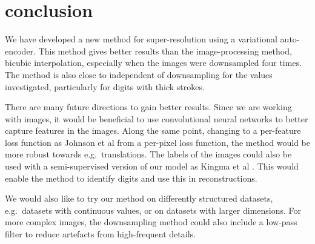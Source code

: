 \section{conclusion}
\label{sec:conclusion}

We have developed a new method for super-resolution using a variational auto-encoder.
This method gives better results than the image-processing method, bicubic interpolation, especially when the images were downsampled four times.
The method is also close to independent of downsampling for the values investigated, particularly for digits with thick strokes.

There are many future directions to gain better results.
Since we are working with images, it would be beneficial to use convolutional neural networks to better capture features in the images.
Along the same point, changing to a per-feature loss function as Johnson et al \cite{Johnson16} from a per-pixel loss function, the method would be more robust towards e.g.\ translations.
The labels of the images could also be used with a semi-supervised version of our model as Kingma et al \cite{Kingma2014}. This would enable the method to identify digits and use this in reconstructions.

We would also like to try our method on differently structured datasets, e.g.\ datasets with continuous values, or on datasets with larger dimensions.
For more complex images, the downsampling method could also include a low-pass filter to reduce artefacts from high-frequent details.
